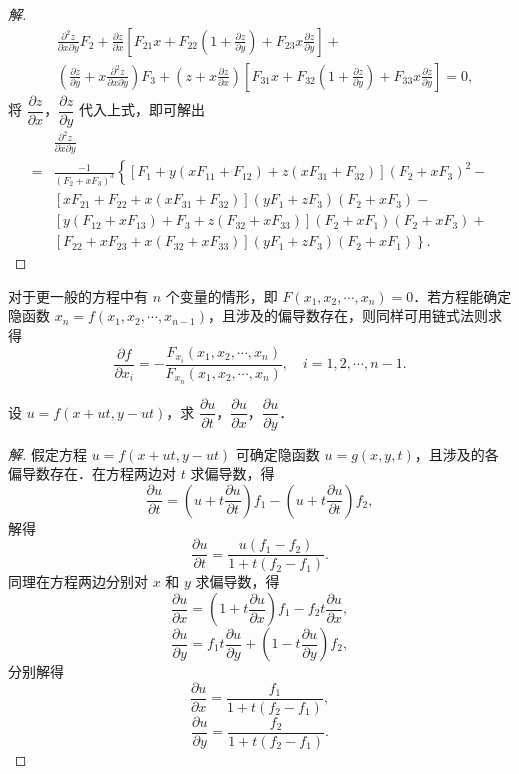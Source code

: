\begin{proof}[解]
\[\begin{aligned}
&\frac{\partial^{2}z}{\partial x\partial y}F_{2}+\frac{\partial z}{\partial x}\left[F_{21}x+F_{22}\left(1+\frac{\partial z}{\partial y}\right)+F_{23}x\frac{\partial z}{\partial y}\right]+\\
&\left(\frac{\partial z}{\partial y}+x\frac{\partial^{2}z}{\partial x\partial y}\right)F_{3}+\left(z+x\frac{\partial z}{\partial x}\right)\left[F_{31}x+F_{32}\left(1+\frac{\partial z}{\partial y}\right)+F_{33}x\frac{\partial z}{\partial y}\right]=0,
\end{aligned}
\]
将 $\dfrac{\partial z}{\partial x}$，$\dfrac{\partial z}{\partial y}$ 代入上式，即可解出
\[
\begin{aligned}
&\frac{\partial^{2}z}{\partial x\partial y}\\
={}&\frac{-1}{\left(F_{2}+xF_{3}\right)^{3}}\left\{\left[F_{1}+y\left(xF_{11}+F_{12}\right)+z\left(xF_{31}+F_{32}\right)\right]\left(F_{2}+xF_{3}\right)^{2}-\right.\\
&\left.\left[xF_{21}+F_{22}+x\left(xF_{31}+F_{32}\right)\right]\left(yF_{1}+zF_{3}\right)\left(F_{2}+xF_{3}\right)-\right.\\
&\left.\left[y\left(F_{12}+xF_{13}\right)+F_{3}+z\left(F_{32}+xF_{33}\right)\right]\left(F_{2}+xF_{1}\right)\left(F_{2}+xF_{3}\right)+\right.\\
&\left.\left[F_{22}+xF_{23}+x\left(F_{32}+xF_{33}\right)\right]\left(yF_{1}+zF_{3}\right)\left(F_{2}+xF_{1}\right)\right\}.
\end{aligned}
\]
\end{proof}

对于更一般的方程中有 $n$ 个变量的情形，即 $F(x_{1},x_{2},\cdots,x_{n})=0$．若方程能确定隐函数 $x_{n}=f(x_{1},x_{2},\cdots,x_{n-1})$，且涉及的偏导数存在，则同样可用链式法则求得
\[
\frac{\partial f}{\partial x_{i}}=-\frac{F_{x_{i}}(x_{1},x_{2},\cdots,x_{n})}{F_{x_{n}}(x_{1},x_{2},\cdots,x_{n})},\quad i=1,2,\cdots,n-1.
\]

\begin{example}\label{ex:16-2-8}
设 $u=f(x+ut,y-ut)$，求 $\dfrac{\partial u}{\partial t}$，$\dfrac{\partial u}{\partial x}$，$\dfrac{\partial u}{\partial y}$．
\end{example}

\begin{proof}[解]
假定方程 $u=f(x+ut,y-ut)$ 可确定隐函数 $u=g(x,y,t)$，且涉及的各偏导数存在．在方程两边对 $t$ 求偏导数，得
\[
\frac{\partial u}{\partial t}=\left(u+t\frac{\partial u}{\partial t}\right)f_{1}-\left(u+t\frac{\partial u}{\partial t}\right)f_{2},
\]
解得
\[
\frac{\partial u}{\partial t}=\frac{u(f_{1}-f_{2})}{1+t(f_{2}-f_{1})}.
\]
同理在方程两边分别对 $x$ 和 $y$ 求偏导数，得
\[
\frac{\partial u}{\partial x}=\left(1+t\frac{\partial u}{\partial x}\right)f_{1}-f_{2}t\frac{\partial u}{\partial x},
\]
\[
\frac{\partial u}{\partial y}=f_{1}t\frac{\partial u}{\partial y}+\left(1-t\frac{\partial u}{\partial y}\right)f_{2},
\]
分别解得
\[
\frac{\partial u}{\partial x}=\frac{f_{1}}{1+t(f_{2}-f_{1})},
\]
\[
\frac{\partial u}{\partial y}=\frac{f_{2}}{1+t(f_{2}-f_{1})}.
\]
\end{proof}

